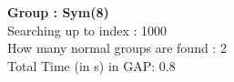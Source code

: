 \textbf{Group : Sym(8)}\\
Searching up to index : 1000\\
How many normal groups are found : 2\\
Total Time (in s) in GAP: 0.8\\
